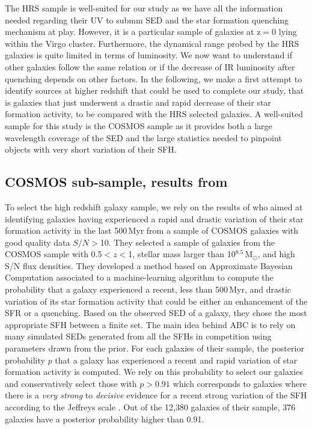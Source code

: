 \documentclass[traditabstract]{aa} %
\begin{document}
The HRS sample is well-suited for our study as we have all the information needed regarding their UV to submm SED and the star formation quenching mechanism at play. 
However, it is a particular sample of galaxies at z$=$0 lying within the Virgo cluster.
Furthermore, the dynamical range probed by the HRS galaxies is quite limited in terms of luminosity.
We now want to understand if other galaxies follow the same relation or if the decrease of IR luminosity after quenching depends on other factors.
In the following, we make a first attempt to identify sources at higher redshift that could be used to complete our study, that is galaxies that just underwent a drastic and rapid decrease of their star formation activity, to be compared with the HRS selected galaxies.
A well-suited sample for this study is the COSMOS sample as it provides both a large wavelength coverage of the SED and the large statistics needed to pinpoint objects with very short variation of their SFH.

\subsection{COSMOS sub-sample, results from \cite{Aufort20}}

To select the high redshift galaxy sample, we rely on the results of \cite{Aufort20} who aimed at identifying galaxies having experienced a rapid and drastic variation of their star formation activity in the last 500\,Myr from a sample of COSMOS galaxies \citep[][]{Laigle16} with good quality data $S/N>$10.
They selected a sample of galaxies from the COSMOS sample with 0.5$<z<$1, stellar mass larger than 10$^{8.5}$\,M$_{\odot}$, and high S/N flux densities.
They developed a method based on Approximate Bayesian Computation \citep[ABC, see, e.g. ][]{marin2012approximate,sisson2018handbook} associated to a machine-learning algorithm \citep[XGBoost, see ][]{chen2016xgboost} to compute the probability that a galaxy experienced a recent, less than 500\,Myr, and drastic variation of its star formation activity that could be either an enhancement of the SFR or a quenching.
Based on the observed SED of a galaxy, they chose the most appropriate SFH between a finite set. 
The main idea behind ABC is to rely on many simulated SEDs generated from all the SFHs in competition using parameters drawn from the prior. 
For each galaxies of their sample, the posterior probability $p$ that a galaxy has experienced a recent and rapid variation of star formation activity is computed.
We rely on this probability to select our galaxies and conservatively select those with $p>0.91$ which corresponds to galaxies where there is a \textit{very strong} to \textit{decisive} evidence for a recent strong variation of the SFH according to the Jeffreys scale \citep[see, e.g., ][]{Robert07}.
Out of the 12,380 galaxies of their sample, 376 galaxies have a posterior probability higher than 0.91.
\end{document}
